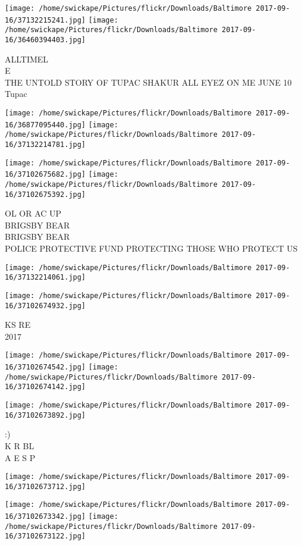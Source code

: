 \documentclass[10pt,letterpaper]{article}
\begin{document}
\texttt{[image: /home/swickape/Pictures/flickr/Downloads/Baltimore 2017-09-16/37132215241.jpg]}
\texttt{[image: /home/swickape/Pictures/flickr/Downloads/Baltimore 2017-09-16/36460394403.jpg]}

ALLTIMEL\\
E\\
THE UNTOLD STORY OF TUPAC SHAKUR ALL EYEZ ON  ME JUNE 10\\
Tupac
\pagebreak

\texttt{[image: /home/swickape/Pictures/flickr/Downloads/Baltimore 2017-09-16/36877095440.jpg]}
\texttt{[image: /home/swickape/Pictures/flickr/Downloads/Baltimore 2017-09-16/37132214781.jpg]}

\texttt{[image: /home/swickape/Pictures/flickr/Downloads/Baltimore 2017-09-16/37102675682.jpg]}
\texttt{[image: /home/swickape/Pictures/flickr/Downloads/Baltimore 2017-09-16/37102675392.jpg]}

OL OR AC UP\\
BRIGSBY BEAR\\
BRIGSBY BEAR\\
POLICE PROTECTIVE FUND PROTECTING THOSE WHO PROTECT US
\pagebreak

\texttt{[image: /home/swickape/Pictures/flickr/Downloads/Baltimore 2017-09-16/37132214061.jpg]}

\vspace{0.25in}
\texttt{[image: /home/swickape/Pictures/flickr/Downloads/Baltimore 2017-09-16/37102674932.jpg]}

KS RE\\
2017
\pagebreak

\texttt{[image: /home/swickape/Pictures/flickr/Downloads/Baltimore 2017-09-16/37102674542.jpg]}
\texttt{[image: /home/swickape/Pictures/flickr/Downloads/Baltimore 2017-09-16/37102674142.jpg]}

\texttt{[image: /home/swickape/Pictures/flickr/Downloads/Baltimore 2017-09-16/37102673892.jpg]}

:)\\
K R BL\\
A E S P
\pagebreak

\texttt{[image: /home/swickape/Pictures/flickr/Downloads/Baltimore 2017-09-16/37102673712.jpg]}

\vspace{0.25in}
\texttt{[image: /home/swickape/Pictures/flickr/Downloads/Baltimore 2017-09-16/37102673342.jpg]}
\texttt{[image: /home/swickape/Pictures/flickr/Downloads/Baltimore 2017-09-16/37102673122.jpg]}
\end{document}

